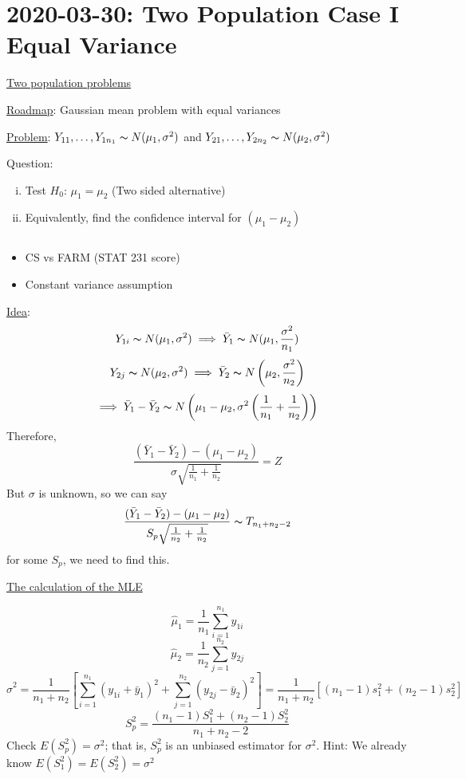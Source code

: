 \section{2020-03-30: Two Population Case I Equal Variance}
\underline{Two population problems}

\underline{Roadmap}: Gaussian mean problem with equal variances

\underline{Problem}: $ Y_{11},\ldots ,Y_{1n_1} \thicksim N(\mu_1,\sigma^2) $ and
$ Y_{21},\ldots ,Y_{2n_2} \thicksim N(\mu_2,\sigma^2) $

Question:
\begin{enumerate}[(i)]
    \item Test $ H_0 $: $ \mu_1=\mu_2 $ (Two sided alternative)
    \item Equivalently, find the confidence interval for $ (\mu_1-\mu_2) $
\end{enumerate}

\begin{exbox}
    \begin{example} $ \; $
        \begin{itemize}
            \item CS vs FARM (STAT 231 score)
            \item Constant variance assumption
        \end{itemize}
    \end{example}
\end{exbox}

\underline{Idea}:
\[ Y_{1i} \thicksim N(\mu_1,\sigma^2)\implies \bar{Y}_1 \thicksim N(\mu_1,\frac{\sigma^2}{n_1} ) \]
\[ Y_{2j} \thicksim N(\mu_2,\sigma^2)\implies \bar{Y}_2 \thicksim N\left( \mu_2,\frac{\sigma^2}{n_2} \right) \]
\[ \implies \bar{Y}_1-\bar{Y}_2
    \thicksim N\left(\mu_1-\mu_2,\sigma^2\left( \frac{1}{n_1} +\frac{1}{n_2} \right)\right) \]
Therefore,
\[ \frac{(\bar{Y}_1-\bar{Y}_2)-(\mu_1-\mu_2)}{\sigma \sqrt{\frac{1}{n_1}+\frac{1}{n_2}}}=Z  \]
But $ \sigma $ is unknown, so we can say
\[ \frac{(\bar{Y}_1-\bar{Y}_2)-(\mu_1-\mu_2)}{S_p\sqrt{\frac{1}{n_2}+\frac{1}{n_2}}}
    \thicksim T_{n_1+n_2-2} \]
for some $ S_p $, we need to find this.

\underline{The calculation of the MLE}

\[ \hat{\mu}_1=\frac{1}{n_1} \sum\limits_{i=1}^{n_1} y_{1i} \]
\[ \hat{\mu}_2=\frac{1}{n_2} \sum\limits_{j=1}^{n_2} y_{2j} \]
\[ \hat{\sigma}^2=\frac{1}{n_1+n_2}\left[ \sum\limits_{i=1}^{n_1}(y_{1i}+\bar{y}_1)^2+ \sum\limits_{j=1}^{n_2}(y_{2j}-\bar{y}_2)^2\right]
    =\frac{1}{n_1+n_2} \left[ (n_1-1)s_1^2+(n_2-1)s_2^2  \right] \]
\[ S_p^2=\frac{(n_1-1)S_1^2+(n_2-1)S_2^2}{n_1+n_2-2} \]
Check $ E(S_p^2)=\sigma^2 $; that is, $ S_p^2 $ is an unbiased estimator
for $ \sigma^2 $. Hint: We already know $ E(S_1^2)=E(S_2^2)=\sigma^2 $

